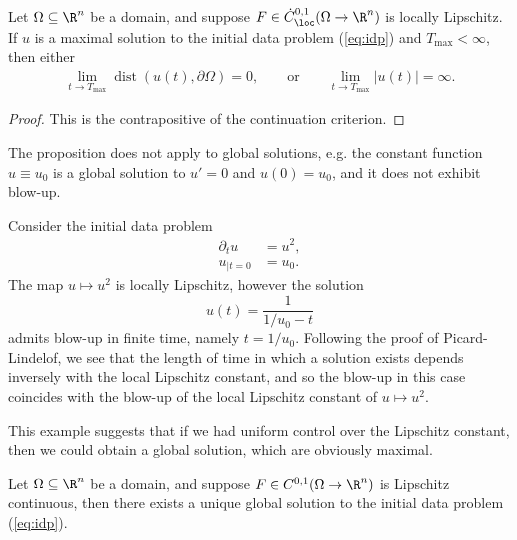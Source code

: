 \begin{corollary}
	Let $\Omega \subseteq \R^n$ be a domain, and suppose $F \in \dot C^{0, 1}_{\loc} (\Omega \to \R^n)$ is locally Lipschitz. If $u$ is a maximal solution to the initial data problem (\ref{eq:idp}) and $T_{\text{max}} < \infty$, then either
		\begin{align*}
			\lim_{t \to T_{\text{max}}}\operatorname{dist} (u(t), \partial \Omega) 
				= 0, \qquad \text{or} \qquad
			\lim_{t \to T_{\text{max}}} |u(t)| 
				= \infty.
		\end{align*}
\end{corollary}

\begin{proof}
	This is the contrapositive of the continuation criterion. 
\end{proof}

\begin{remark}
	The proposition does not apply to global solutions, e.g. the constant function $u \equiv u_0$ is a global solution to $u' = 0$ and $u(0) = u_0$, and it does not exhibit blow-up. 
\end{remark}

\begin{example}
	Consider the initial data problem
	\begin{align*}
		\partial_t u	
			&= u^2, \\
		u_{|t = 0}	
			&= u_0.
	\end{align*}
The map $u \mapsto u^2$ is locally Lipschitz, however the solution
	\[ u(t) = \frac{1}{1/u_0 - t} \]	
admits blow-up in finite time, namely $t = 1/u_0$. Following the proof of Picard-Lindelof, we see that the length of time in which a solution exists depends inversely with the local Lipschitz constant, and so the blow-up in this case coincides with the blow-up of the local Lipschitz constant of $u \mapsto u^2$. 
\end{example}

This example suggests that if we had uniform control over the Lipschitz constant, then we could obtain a global solution, which are obviously maximal. 

\begin{proposition}
	Let $\Omega \subseteq \R^n$ be a domain, and suppose $F \in C^{0, 1} (\Omega \to \R^n)$ is Lipschitz continuous, then there exists a unique global solution to the initial data problem  (\ref{eq:idp}).
\end{proposition}

